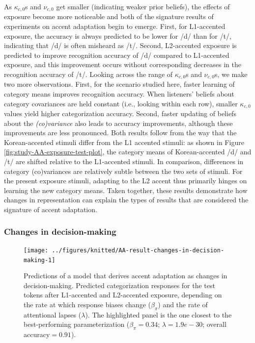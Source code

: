 \documentclass[
  11pt,
  man,floatsintext]{apa6}
\begin{document}
As \(\kappa_{c,0}\)s and \(\nu_{c,0}\) get smaller (indicating weaker prior beliefs), the effects of exposure become more noticeable and both of the signature results of experiments on accent adaptation begin to emerge. First, for L1-accented exposure, the accuracy is always predicted to be lower for /d/ than for /t/, indicating that /d/ is often misheard as /t/. Second, L2-accented exposure is predicted to improve recognition accuracy of /d/ compared to L1-accented exposure, and this improvement occurs without corresponding decreases in the recognition accuracy of /t/. Looking across the range of \(\kappa_{c,0}\)s and \(\nu_{c,0}\)s, we make two more observations. First, for the scenario studied here, faster learning of category means improves recognition accuracy. When listeners' beliefs about category covariances are held constant (i.e., looking within each row), smaller \(\kappa_{c,0}\) values yield higher categorization accuracy. Second, faster updating of beliefs about the \emph{(co)variance} also leads to accuracy improvements, although these improvements are less pronounced. Both results follow from the way that the Korean-accented stimuli differ from the L1 accented stimuli: as shown in Figure \ref{fig:study-AA-exposure-test-plot}, the category means of Korean-accented /d/ and /t/ are shifted relative to the L1-accented stimuli. In comparison, differences in category (co)variances are relatively subtle between the two sets of stimuli. For the present exposure stimuli, adapting to the L2 accent thus primarily hinges on learning the new category means. Taken together, these results demonstrate how changes in representation can explain the types of results that are considered the signature of accent adaptation.

\hypertarget{changes-in-decision-making-1}{%
\subsubsection{Changes in decision-making}\label{changes-in-decision-making-1}}



\begin{figure}

{\centering \texttt{[image: ../figures/knitted/AA-result-changes-in-decision-making-1]} 

}

\caption{Predictions of a model that derives accent adaptation as changes in decision-making. Predicted categorization responses for the test tokens after L1-accented and L2-accented exposure, depending on the rate at which response biases change (\(\beta_{\pi}\)) and the rate of attentional lapses (\(\lambda\)). The highlighted panel is the one closest to the best-performing parameterization (\(\beta_{\pi} = 0.34\); \(\lambda=1.9e-30\); overall accuracy\(=0.91\)).}\label{fig:AA-result-changes-in-decision-making}
\end{figure}
\end{document}

